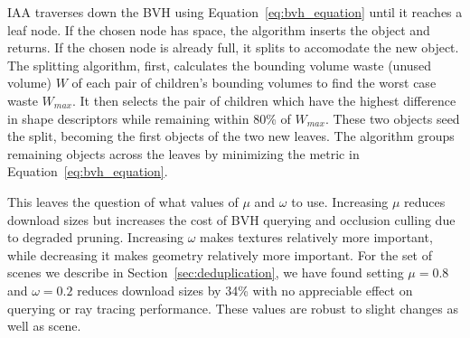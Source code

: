 IAA traverses down the BVH using Equation~\ref{eq:bvh_equation} until
it reaches a leaf node. If the chosen node has space, the algorithm
inserts the object and returns.  If the chosen node is already full,
it splits to accomodate the new object.  The splitting algorithm,
first, calculates the bounding volume waste
(unused volume) $W$ of each pair of children's bounding volumes to find
the worst case waste $W_{max}$.  It then selects the pair of children
which have the highest difference in shape descriptors while remaining
within 80\% of $W_{max}$. These two objects seed the split, becoming
the first objects of the two new leaves.  The algorithm groups
remaining objects across the leaves by minimizing the metric in
Equation~\ref{eq:bvh_equation}.

This leaves the question of what values of $\mu$ and $\omega$ to use.
Increasing $\mu$ reduces download sizes but increases the cost of
BVH querying and occlusion culling due to degraded pruning.  
Increasing $\omega$ makes
textures relatively more important, while decreasing it makes geometry
relatively more important. For the set of scenes we describe in
Section~\ref{sec:deduplication}, we have found setting $\mu=0.8$ and
$\omega=0.2$ reduces download sizes by 34\% with no appreciable effect
on querying or ray tracing performance. 
These values are robust to slight changes as well as
scene. 



